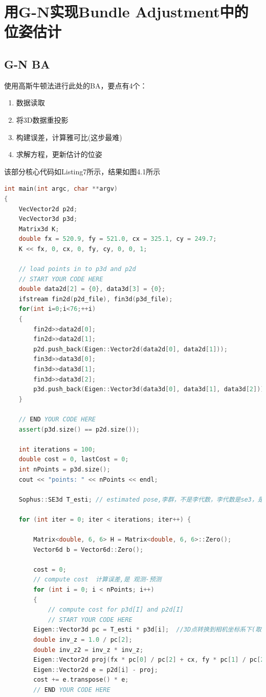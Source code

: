 \documentclass[40pt,a4paper，UTF8]{ctexart}
\numberwithin{equation}{section}
\begin{document}
\section{用G-N实现Bundle Adjustment中的位姿估计}
\subsection{G-N BA}
使用高斯牛顿法进行此处的BA，要点有4个：
\begin{enumerate}
\item 数据读取 
\item 将3D数据重投影
\item 构建误差，计算雅可比(这步最难)
\item 求解方程，更新估计的位姿
\end{enumerate}
该部分核心代码如Listing7所示，结果如图4.1所示
\begin{lstlisting}[language=C++, caption=CMakeLists.txt]
int main(int argc, char **argv)
{
    VecVector2d p2d;
    VecVector3d p3d;
    Matrix3d K;
    double fx = 520.9, fy = 521.0, cx = 325.1, cy = 249.7;
    K << fx, 0, cx, 0, fy, cy, 0, 0, 1;

    // load points in to p3d and p2d
    // START YOUR CODE HERE
    double data2d[2] = {0}, data3d[3] = {0};
    ifstream fin2d(p2d_file), fin3d(p3d_file);
    for(int i=0;i<76;++i)
    {
        fin2d>>data2d[0];
        fin2d>>data2d[1];
        p2d.push_back(Eigen::Vector2d(data2d[0], data2d[1]));
        fin3d>>data3d[0];
        fin3d>>data3d[1];
        fin3d>>data3d[2];
        p3d.push_back(Eigen::Vector3d(data3d[0], data3d[1], data3d[2]));
    }

    // END YOUR CODE HERE
    assert(p3d.size() == p2d.size());

    int iterations = 100;
    double cost = 0, lastCost = 0;
    int nPoints = p3d.size();
    cout << "points: " << nPoints << endl;

    Sophus::SE3d T_esti; // estimated pose,李群，不是李代数，李代数是se3，是Vector3d

    for (int iter = 0; iter < iterations; iter++) {

        Matrix<double, 6, 6> H = Matrix<double, 6, 6>::Zero();
        Vector6d b = Vector6d::Zero();

        cost = 0;
        // compute cost  计算误差,是 观测-预测
        for (int i = 0; i < nPoints; i++)
        {
            // compute cost for p3d[I] and p2d[I]
            // START YOUR CODE HERE
        Eigen::Vector3d pc = T_esti * p3d[i];  //3D点转换到相机坐标系下(取了前3维)
        double inv_z = 1.0 / pc[2];
        double inv_z2 = inv_z * inv_z;
        Eigen::Vector2d proj(fx * pc[0] / pc[2] + cx, fy * pc[1] / pc[2] + cy);  //重投影，预测
        Eigen::Vector2d e = p2d[i] - proj;
        cost += e.transpose() * e;
	    // END YOUR CODE HERE


\end{lstlisting}
\end{document}
